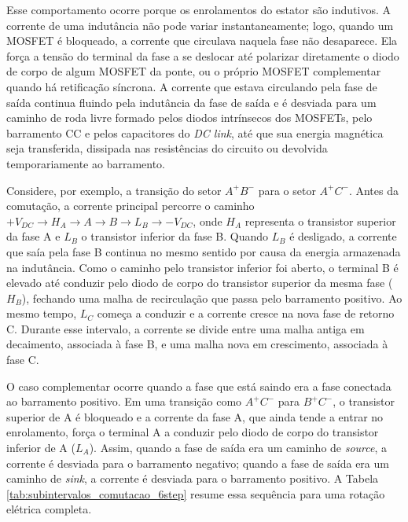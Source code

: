  Esse comportamento ocorre porque os enrolamentos do estator são indutivos. A corrente de uma indutância não pode variar instantaneamente; logo, quando um MOSFET é bloqueado, a corrente que circulava naquela fase não desaparece. Ela força a tensão do terminal da fase a se deslocar até polarizar diretamente o diodo de corpo de algum MOSFET da ponte, ou o próprio MOSFET complementar quando há retificação síncrona. A corrente que estava circulando pela fase de saída continua fluindo pela indutância da fase de saída e é desviada para um caminho de roda livre formado pelos diodos intrínsecos dos MOSFETs, pelo barramento CC e pelos capacitores do \textit{DC link}, até que sua energia magnética seja transferida, dissipada nas resistências do circuito ou devolvida temporariamente ao barramento.

 Considere, por exemplo, a transição do setor $A^+B^-$ para o setor $A^+C^-$. Antes da comutação, a corrente principal percorre o caminho $+V_{DC} \rightarrow H_A \rightarrow A \rightarrow B \rightarrow L_B \rightarrow -V_{DC}$, onde $H_A$ representa o transistor superior da fase A e $L_B$ o transistor inferior da fase B. Quando $L_B$ é desligado, a corrente que saía pela fase B continua no mesmo sentido por causa da energia armazenada na indutância. Como o caminho pelo transistor inferior foi aberto, o terminal B é elevado até conduzir pelo diodo de corpo do transistor superior da mesma fase ($H_B$), fechando uma malha de recirculação que passa pelo barramento positivo. Ao mesmo tempo, $L_C$ começa a conduzir e a corrente cresce na nova fase de retorno C. Durante esse intervalo, a corrente se divide entre uma malha antiga em decaimento, associada à fase B, e uma malha nova em crescimento, associada à fase C.

 O caso complementar ocorre quando a fase que está saindo era a fase conectada ao barramento positivo. Em uma transição como $A^+C^-$ para $B^+C^-$, o transistor superior de A é bloqueado e a corrente da fase A, que ainda tende a entrar no enrolamento, força o terminal A a conduzir pelo diodo de corpo do transistor inferior de A ($L_A$). Assim, quando a fase de saída era um caminho de \textit{source}, a corrente é desviada para o barramento negativo; quando a fase de saída era um caminho de \textit{sink}, a corrente é desviada para o barramento positivo. A Tabela \ref{tab:subintervalos_comutacao_6step} resume essa sequência para uma rotação elétrica completa.

